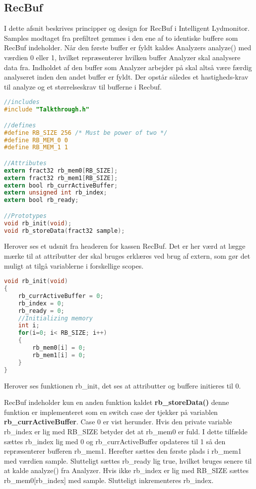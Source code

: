 \subsection*{RecBuf}
I dette afsnit beskrives principper og design for RecBuf i Intelligent Lydmonitor.
Samples modtaget fra prefiltret gemmes i den ene af to identiske buffere som RecBuf indeholder. Når den første buffer er fyldt kaldes Analyzers analyze() med værdien 0 eller 1, hvilket repræsenterer hvilken buffer Analyzer skal analysere data fra. Indholdet af den buffer som Analyzer arbejder på skal altså være færdig analyseret inden den andet buffer er fyldt. Der opstår således et hastigheds-krav til analyze og et størrelseskrav til bufferne i Recbuf. 

\begin{lstlisting}[language=C,numbers=none]
//includes
#include "Talkthrough.h"

//defines
#define RB_SIZE 256 /* Must be power of two */
#define RB_MEM_0 0
#define RB_MEM_1 1

//Attributes
extern fract32 rb_mem0[RB_SIZE];
extern fract32 rb_mem1[RB_SIZE];
extern bool rb_currActiveBuffer;
extern unsigned int rb_index;
extern bool rb_ready;

//Prototypes
void rb_init(void);
void rb_storeData(fract32 sample);
\end{lstlisting}

Herover ses et udsnit fra headeren for kassen RecBuf. Det er her værd at lægge mærke til at attributter der skal bruges erklæres ved brug af extern, som gør det muligt at tilgå variablerne i forskellige scopes. 

\begin{lstlisting}[language=C,numbers=none]
void rb_init(void)
{
    rb_currActiveBuffer = 0;
    rb_index = 0;
    rb_ready = 0;
    //Initializing memory
    int i;
    for(i=0; i< RB_SIZE; i++)
    {
        rb_mem0[i] = 0;
        rb_mem1[i] = 0;
    }
}
\end{lstlisting}

Herover ses funktionen rb\_init, det ses at attributter og buffere initieres til 0.

RecBuf indeholder kun en anden funktion kaldet \textbf{rb\_storeData()} denne funktion er implementeret som en switch case der tjekker på variablen \textbf{rb\_currActiveBuffer}. Case 0 er vist herunder. 
Hvis den private variable rb\_index er lig med RB\_SIZE betyder det at rb\_mem0 er fuld. I dette tilfælde sættes rb\_index lig med 0 og rb\_currActiveBuffer opdateres til 1 så den repræsenterer bufferen rb\_mem1. Herefter sættes den første plads i rb\_mem1 med værdien sample. Slutteligt sættes rb\_ready lig true, hvilket bruges senere til at kalde analyze() fra Analyzer. Hvis ikke rb\_index er lig med RB\_SIZE sættes rb\_mem0[rb\_index] med sample. Slutteligt inkrementeres rb\_index. 

